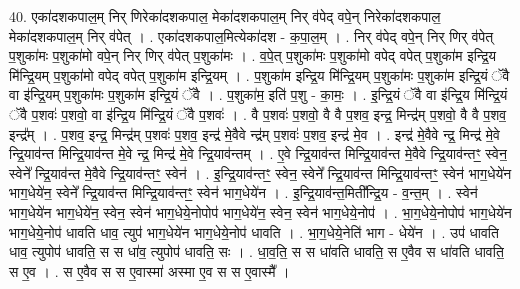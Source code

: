 \documentclass[17pt]{extarticle}
\begin{document}
40. एका॑दशकपाल॒म् निर् णिरेका॑दशकपाल॒ मेका॑दशकपाल॒म् निर् व॑पेद् वपे॒न् निरेका॑दशकपाल॒ मेका॑दशकपाल॒म् निर् व॑पेत् । . एका॑दशकपाल॒मित्येका॑दश - क॒पा॒ल॒म् । . निर् व॑पेद् वपे॒न् निर् णिर् व॑पेत् प॒शुका॑मः प॒शुका॑मो वपे॒न् निर् णिर् व॑पेत् प॒शुका॑मः । . व॒पे॒त् प॒शुका॑मः प॒शुका॑मो वपेद् वपेत् प॒शुका॑म इन्द्रि॒य मि॑न्द्रि॒यम् प॒शुका॑मो वपेद् वपेत् प॒शुका॑म इन्द्रि॒यम् । . प॒शुका॑म इन्द्रि॒य मि॑न्द्रि॒यम् प॒शुका॑मः प॒शुका॑म इन्द्रि॒यं ॅवै वा इ॑न्द्रि॒यम् प॒शुका॑मः प॒शुका॑म इन्द्रि॒यं ॅवै । . प॒शुका॑म॒ इति॑ प॒शु - का॒मः॒ । . इ॒न्द्रि॒यं ॅवै वा इ॑न्द्रि॒य मि॑न्द्रि॒यं ॅवै प॒शवः॑ प॒शवो॒ वा इ॑न्द्रि॒य मि॑न्द्रि॒यं ॅवै प॒शवः॑ । . वै प॒शवः॑ प॒शवो॒ वै वै प॒शव॒ इन्द्र॒ मिन्द्र॑म् प॒शवो॒ वै वै प॒शव॒ इन्द्र᳚म् । . प॒शव॒ इन्द्र॒ मिन्द्र॑म् प॒शवः॑ प॒शव॒ इन्द्र॑ मे॒वैवे न्द्र॑म् प॒शवः॑ प॒शव॒ इन्द्र॑ मे॒व । . इन्द्र॑ मे॒वैवे न्द्र॒ मिन्द्र॑ मे॒वे न्द्रि॒याव॑न्त मिन्द्रि॒याव॑न्त मे॒वे न्द्र॒ मिन्द्र॑ मे॒वे न्द्रि॒याव॑न्तम् । . ए॒वे न्द्रि॒याव॑न्त मिन्द्रि॒याव॑न्त मे॒वैवे न्द्रि॒याव॑न्तꣳ॒॒ स्वेन॒ स्वेने᳚ न्द्रि॒याव॑न्त मे॒वैवे न्द्रि॒याव॑न्तꣳ॒॒ स्वेन॑ । . इ॒न्द्रि॒याव॑न्तꣳ॒॒ स्वेन॒ स्वेने᳚ न्द्रि॒याव॑न्त मिन्द्रि॒याव॑न्तꣳ॒॒ स्वेन॑ भाग॒धेये॑न भाग॒धेये॑न॒ स्वेने᳚ न्द्रि॒याव॑न्त मिन्द्रि॒याव॑न्तꣳ॒॒ स्वेन॑ भाग॒धेये॑न । . इ॒न्द्रि॒याव॑न्त॒मिती᳚न्द्रि॒य - व॒न्त॒म् । . स्वेन॑ भाग॒धेये॑न भाग॒धेये॑न॒ स्वेन॒ स्वेन॑ भाग॒धेये॒नोपोप॑ भाग॒धेये॑न॒ स्वेन॒ स्वेन॑ भाग॒धेये॒नोप॑ । . भा॒ग॒धेये॒नोपोप॑ भाग॒धेये॑न भाग॒धेये॒नोप॑ धावति धाव॒ त्युप॑ भाग॒धेये॑न भाग॒धेये॒नोप॑ धावति । . भा॒ग॒धेये॒नेति॑ भाग - धेये॑न । . उप॑ धावति धाव॒ त्युपोप॑ धावति॒ स स धा॑व॒ त्युपोप॑ धावति॒ सः । . धा॒व॒ति॒ स स धा॑वति धावति॒ स ए॒वैव स धा॑वति धावति॒ स ए॒व । . स ए॒वैव स स ए॒वास्मा॑ अस्मा ए॒व स स ए॒वास्मै᳚ । \newline
\pagebreak
{}
\end{document}
